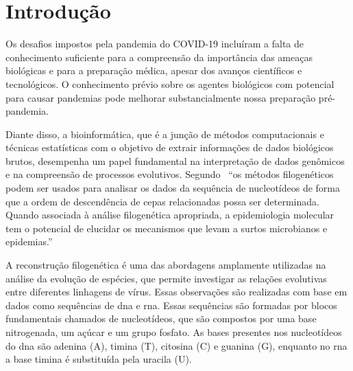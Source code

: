 
\chapter{Introdução}

\setlength{\parskip}{0.3cm}



Os desafios impostos pela pandemia do COVID-19 incluíram a falta de conhecimento suficiente para a compreensão da importância das ameaças biológicas e para a preparação médica, apesar dos avanços científicos e tecnológicos. O conhecimento prévio sobre os agentes biológicos com potencial para causar pandemias pode melhorar substancialmente nossa preparação pré-pandemia.~\cite[p. 1]{behl_threat_2022}

Diante disso, a bioinformática, que é a junção de métodos computacionais e técnicas estatísticas com o objetivo de extrair informações de dados biológicos brutos, desempenha um papel fundamental na interpretação de dados genômicos e na compreensão de processos evolutivos.
Segundo~\cite[p.1]{barry_phylogenetic_analysis_2006} ``os métodos filogenéticos podem ser usados para analisar os dados da sequência de nucleotídeos de forma que a ordem de descendência de cepas relacionadas possa ser determinada. Quando associada à análise filogenética apropriada, a epidemiologia molecular tem o potencial de elucidar os mecanismos que levam a surtos microbianos e epidemias.''

A reconstrução filogenética é uma das abordagens amplamente utilizadas na análise da evolução de espécies, que permite investigar as relações evolutivas entre diferentes linhagens de vírus. Essas observações são realizadas com base em dados como sequências de \ac{dna} e \ac{rna}. Essas sequências são formadas por blocos fundamentais chamados de nucleotídeos, que são compostos por uma base nitrogenada, um açúcar e um grupo fosfato. As bases presentes nos nucleotídeos do \ac{dna} são adenina (A), timina (T), citosina (C) e guanina (G), enquanto no \ac{rna} a base timina é substituída pela uracila (U).~\cite{alberts2002molecular}

